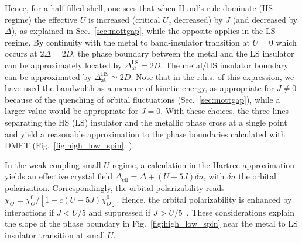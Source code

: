 \documentclass[]{ar2e-changed}%
\begin{document}
Hence, for a half-filled shell, one sees that when Hund's rule dominate (HS regime) the 
effective $U$ is increased  (critical $U_c$ decreased) by $J$ (and decreased by $\Delta$), 
as explained in Sec.~\ref{sec:mottgap}, while the opposite applies in the LS regime. 
%
By continuity with the metal to band-insulator transition at $U=0$ which occurs at $2\Delta=2D$, the phase boundary between the 
metal and the LS insulator can be approximately located by $\Delta^{\mathrm{LS}}_{\mathrm{at}}=2D$. 
%
The metal/HS insulator boundary can be approximated by $\Delta^{\mathrm{HS}}_{\mathrm{at}}\simeq 2D$. Note that in the 
r.h.s. of this expression, we have used the bandwidth as a measure of kinetic energy, as appropriate for $J\neq 0$ 
because of the quenching of orbital fluctuations (Sec.~\ref{sec:mottgap}), while a larger value would 
be appropriate for $J=0$. 
%
%
With these choices, the three lines separating the HS (LS) insulator and the metallic phase cross at a 
single point and yield a reasonable approximation to the phase boundaries 
calculated with DMFT (Fig.~\ref{fig:high_low_spin}, \cite{werner07_hilowspin,kunes_review_epjst_2009,kunes_HS_LS_prl_2011}). 

In the weak-coupling small $U$ regime, a calculation in the Hartree approximation~\cite{Lechermann_BaVS3_proceeding, OkamotoMillis_CSRO}
yields an effective crystal field $\Delta_{\mathrm{eff}} = \Delta + (U-5J)\delta n$, with $\delta n$ 
the orbital polarization. Correspondingly, the orbital polarizability reads 
$\chi_O=\chi_O^0/[1-c(U-5J)\chi_O^0]$. Hence, the orbital polarizability is enhanced by 
interactions if $J<U/5$ and suppressed if $J>U/5$~\cite{OkamotoMillis_CSRO,Lechermann_BaVS3_proceeding}. 
These considerations explain the slope of the 
phase boundary in Fig.~\ref{fig:high_low_spin} near the metal to LS insulator transition at small $U$. 
\end{document}
